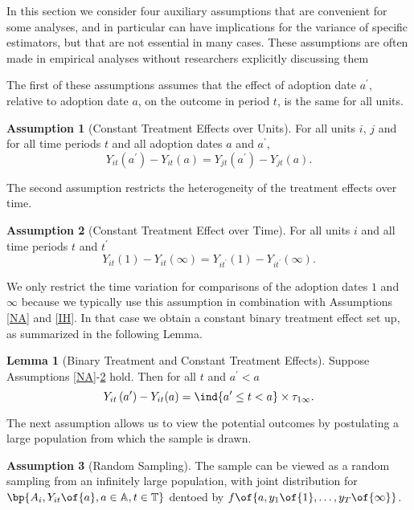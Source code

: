 \documentclass[12pt]{article}
\theoremstyle{definition}
\newtheorem{assumption}{Assumption}
\newtheorem{lemma}[theorem]{Lemma}
\begin{document}
In this section we consider four auxiliary assumptions that are convenient for some analyses, and in particular can have implications for the variance of specific estimators, but that are not essential in many cases. These assumptions are often made in empirical analyses without researchers explicitly discussing them 

The first of these assumptions assumes that the effect of adoption date $a^{\prime}$, relative to adoption date $a$, on the outcome in period $t$, is the same for all units.

\begin{assumption}[Constant Treatment Effects over Units] \label{CTEU}
    For all units $i$, $j$ and for all time periods $t$ and all adoption dates $a$ and $a^{\prime}$,
    $$
    Y_{i t}\left(a^{\prime}\right)-Y_{i t}(a)=Y_{j t}\left(a^{\prime}\right)-Y_{j t}(a).
    $$
\end{assumption}

The second assumption restricts the heterogeneity of the treatment effects over time. 

\begin{assumption}[Constant Treatment Effect over Time] \label{CTET}
    For all units $i$ and all time periods $t$ and $t^{\prime}$ 
    $$
    Y_{i t}(1)-Y_{i t}(\infty)=Y_{i t^{\prime}}(1)-Y_{i t^{\prime}}(\infty) .
    $$
\end{assumption}

We only restrict the time variation for comparisons of the adoption dates $1$ and $\infty$ because we typically use this assumption in combination with Assumptions \ref{NA} and \ref{IH}. In that case we obtain a constant binary treatment effect set up, as summarized in the following Lemma.

\begin{lemma}[Binary Treatment and Constant Treatment Effects]
    Suppose Assumptions \ref{NA}-\ref{CTET} hold. Then for all $t$ and $a^{\prime} < a$
    $$
    Y_{i t}\left(a^{\prime}\right)-Y_{i t}(a)=\ind{a^{\prime} \leq t<a} \times \tau_{1 \infty}.
    $$
\end{lemma}

The next assumption allows us to view the potential outcomes by postulating a large population from which the sample is drawn. 

\begin{assumption}[Random Sampling] \label{RS}
    The sample can be viewed as a random sampling from an infinitely large population, with joint distribution for $\bp{A_i, Y_{it}\of{a}, a \in \mathbb{A}, t \in \mathbb{T}}$ dentoed by $f\of{a, y_1\of{1}, \ldots, y_T\of{\infty}}$.    
\end{assumption}
\end{document}
